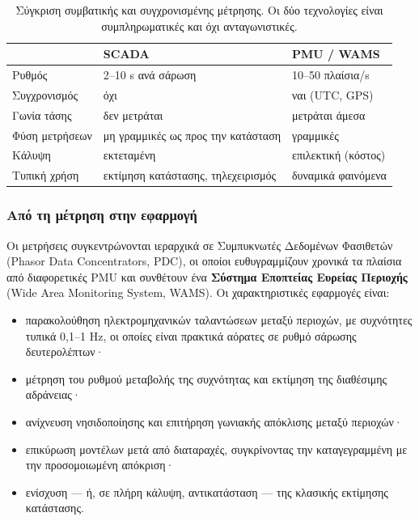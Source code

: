 \begin{table}[!htbp]
\centering
\begin{tabular}{lll}
\hline
 & SCADA & PMU / WAMS \\
\hline
Ρυθμός           & 2--10 s ανά σάρωση & 10--50 πλαίσια/s \\
Συγχρονισμός     & όχι                & ναι (UTC, GPS) \\
Γωνία τάσης      & δεν μετράται       & μετράται άμεσα \\
Φύση μετρήσεων   & μη γραμμικές ως προς την κατάσταση & γραμμικές \\
Κάλυψη           & εκτεταμένη         & επιλεκτική (κόστος) \\
Τυπική χρήση     & εκτίμηση κατάστασης, τηλεχειρισμός & δυναμικά φαινόμενα \\
\hline
\end{tabular}
\caption{Σύγκριση συμβατικής και συγχρονισμένης μέτρησης. Οι δύο τεχνολογίες είναι
συμπληρωματικές και όχι ανταγωνιστικές.}
\label{tab:scada-pmu}
\end{table}

\subsubsection*{Από τη μέτρηση στην εφαρμογή}

Οι μετρήσεις συγκεντρώνονται ιεραρχικά σε Συμπυκνωτές Δεδομένων Φασιθετών (Phasor Data
Concentrators, PDC), οι οποίοι ευθυγραμμίζουν χρονικά τα πλαίσια από διαφορετικές PMU και
συνθέτουν ένα \textbf{Σύστημα Εποπτείας Ευρείας Περιοχής} (Wide Area Monitoring System,
WAMS). Οι χαρακτηριστικές εφαρμογές είναι:

\begin{itemize}
\item παρακολούθηση ηλεκτρομηχανικών ταλαντώσεων μεταξύ περιοχών, με συχνότητες τυπικά
      0,1--1 Hz, οι οποίες είναι πρακτικά αόρατες σε ρυθμό σάρωσης δευτερολέπτων·
\item μέτρηση του ρυθμού μεταβολής της συχνότητας και εκτίμηση της διαθέσιμης αδράνειας·
\item ανίχνευση νησιδοποίησης και επιτήρηση γωνιακής απόκλισης μεταξύ περιοχών·
\item επικύρωση μοντέλων μετά από διαταραχές, συγκρίνοντας την καταγεγραμμένη με την
      προσομοιωμένη απόκριση·
\item ενίσχυση — ή, σε πλήρη κάλυψη, αντικατάσταση — της κλασικής εκτίμησης κατάστασης.
\end{itemize}

